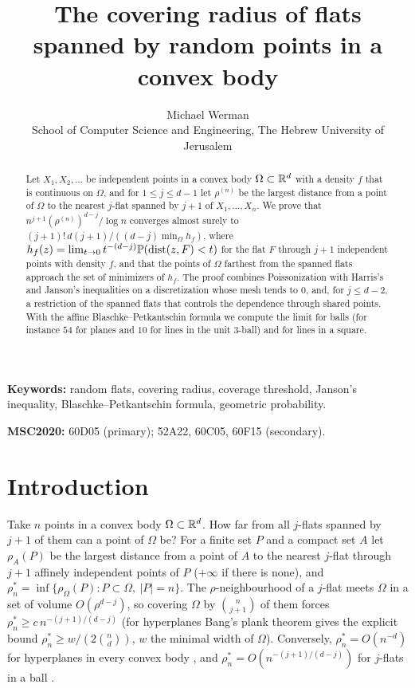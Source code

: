 \documentclass[11pt]{article}
\title{The covering radius of flats spanned by random points in a convex body}
\author{Michael Werman\\[2pt]
\small School of Computer Science and Engineering, The Hebrew University of Jerusalem}
\date{}
\begin{document}
\maketitle

\begin{abstract}
Let $X_1,X_2,\dots$ be independent points in a convex body $\Omega\subset\mathbb{R}^d$ with a density $f$ that is continuous on $\Omega$, and
for $1\le j\le d-1$ let $\rho^{(n)}$ be the largest distance from a point of $\Omega$ to the nearest $j$-flat spanned by $j+1$ of
$X_1,\dots,X_n$. We prove that $n^{j+1}(\rho^{(n)})^{d-j}/\log n$ converges almost surely to $(j+1)!\,d(j+1)/((d-j)\min_\Omega h_f)$,
where $h_f(z)=\lim_{t\to0}t^{-(d-j)}\mathbb{P}(\operatorname{dist}(z,F)<t)$ for the flat $F$ through $j+1$ independent points with density $f$, and that
the points of $\Omega$ farthest from the spanned flats approach the set of minimizers of $h_f$. The proof combines Poissonization
with Harris's and Janson's inequalities on a discretization whose mesh tends to $0$, and, for $j\le d-2$, a restriction of the
spanned flats that controls the dependence through shared points. With the affine Blaschke--Petkantschin formula we compute the
limit for balls (for instance $54$ for planes and $10$ for lines in the unit $3$-ball) and for lines in a square.
\end{abstract}

\noindent\textbf{Keywords:} random flats, covering radius, coverage threshold, Janson's inequality, Blaschke--Petkantschin
formula, geometric probability.

\noindent\textbf{MSC2020:} 60D05 (primary); 52A22, 60C05, 60F15 (secondary).

\section{Introduction}

Take $n$ points in a convex body $\Omega\subset\mathbb{R}^d$. How far from all $j$-flats spanned by $j+1$ of them can a point of $\Omega$
be? For a finite set $P$ and a compact set $A$ let $\rho_A(P)$ be the largest distance from a point of $A$ to the nearest $j$-flat
through $j+1$ affinely independent points of $P$ ($+\infty$ if there is none), and $\rho^*_n=\inf\{\rho_\Omega(P):P\subset\Omega,\
|P|=n\}$. The $\rho$-neighbourhood of a $j$-flat meets $\Omega$ in a set of volume $O(\rho^{d-j})$, so covering $\Omega$ by
$\binom n{j+1}$ of them forces $\rho^*_n\ge c\,n^{-(j+1)/(d-j)}$ (for hyperplanes Bang's plank theorem \cite{Bang} gives the explicit
bound $\rho^*_n\ge w/(2\binom nd)$, $w$ the minimal width of $\Omega$). Conversely, $\rho^*_n=O(n^{-d})$ for hyperplanes in every convex
body \cite[Proposition~6.10]{Companion}, and $\rho^*_n=O(n^{-(j+1)/(d-j)})$ for $j$-flats in a ball \cite[Section~6.3]{Companion}.
\end{document}
